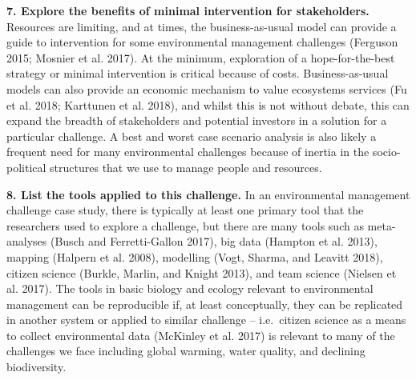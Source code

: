 \documentclass[fleqn,10pt]{wlpeerj} %
\begin{document}
\textbf{7. Explore the benefits of minimal intervention for
stakeholders.} Resources are limiting, and at times, the
business-as-usual model can provide a guide to intervention for some
environmental management challenges (Ferguson 2015; Mosnier et al.
2017). At the minimum, exploration of a hope-for-the-best strategy or
minimal intervention is critical because of costs. Business-as-usual
models can also provide an economic mechanism to value ecosystems
services (Fu et al. 2018; Karttunen et al. 2018), and whilst this is not
without debate, this can expand the breadth of stakeholders and
potential investors in a solution for a particular challenge. A best and
worst case scenario analysis is also likely a frequent need for many
environmental challenges because of inertia in the socio-political
structures that we use to manage people and resources.

\textbf{8. List the tools applied to this challenge.} In an
environmental management challenge case study, there is typically at
least one primary tool that the researchers used to explore a challenge,
but there are many tools such as meta-analyses (Busch and
Ferretti-Gallon 2017), big data (Hampton et al. 2013), mapping (Halpern
et al. 2008), modelling (Vogt, Sharma, and Leavitt 2018), citizen
science (Burkle, Marlin, and Knight 2013), and team science (Nielsen et
al. 2017). The tools in basic biology and ecology relevant to
environmental management can be reproducible if, at least conceptually,
they can be replicated in another system or applied to similar challenge
-- i.e.~citizen science as a means to collect environmental data
(McKinley et al. 2017) is relevant to many of the challenges we face
including global warming, water quality, and declining biodiversity.
\end{document}
